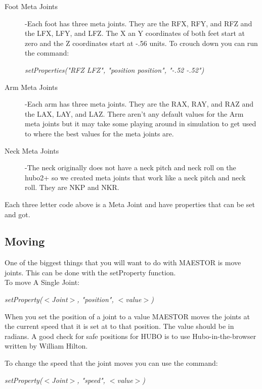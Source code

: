 \documentclass[12pt]{article}
\begin{document}
\begin{description}
	\item[Foot Meta Joints]
	-Each foot has three meta joints. They are the RFX, RFY, and RFZ and the LFX, LFY, and LFZ. The X an Y coordinates of both feet start at zero and the Z coordinates start at -.56 units. To crouch down you can run the command: 
	\begin{center}
		\textit{setProperties("RFZ LFZ", "position position", "-.52 -.52")}
	\end{center}
	
	
	\item[Arm Meta Joints]
	-Each arm has three meta joints. They are the RAX, RAY, and RAZ and the LAX, LAY, and LAZ. There aren't any default values for the Arm meta joints but it may take some playing around in simulation to get used to where the best values for the meta joints are. 
	
	\item[Neck Meta Joints]
	-The neck originally does not have a neck pitch and neck roll on the hubo2+ so we created meta joints that work like a neck pitch and neck roll. They are NKP and NKR. 
	
\end{description}
Each three letter code above is a Meta Joint and have properties that can be set and got.
\subsection{Moving}

One of the biggest things that you will want to do with MAESTOR is move joints. This can be done with the setProperty function.\\ 

To move A Single Joint:
	\begin{center}
		\textit{setProperty($<$Joint$>$, "position", $<$value$>$)}
	\end{center}

When you set the position of a joint to a value MAESTOR moves the joints at the current speed that it is set at to that position. The value should be in radians. A good check for safe positions for HUBO is to use Hubo-in-the-browser written by William Hilton. 

To change the speed that the joint moves you can use the command:
	\begin{center}
		\textit{setProperty($<$Joint$>$, "speed", $<$value$>$)}
	\end{center}
	
\end{document}
